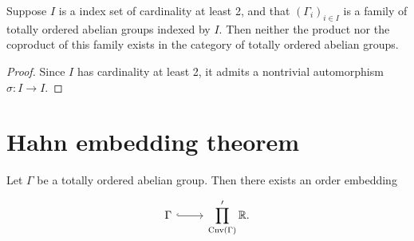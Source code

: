 \begin{lemma}
Suppose $I$ is a index set of cardinality at least 2, and that $(\Gamma_i)_{i \in I}$ is a family of totally ordered abelian groups indexed by $I$. Then neither the product nor the coproduct of this family exists in the category of totally ordered abelian groups. 
\end{lemma}

\begin{proof}
Since $I$ has cardinality at least 2, it admits a nontrivial automorphism $\sigma : I \to I$.
\end{proof}


\section{Hahn embedding theorem}

\begin{proposition}
Let $\Gamma$ be a totally ordered abelian group. Then there exists an order embedding
\[ \begin{tikzcd} \Gamma \ar[hookrightarrow]{r} & \displaystyle \prod_{\Convex(\Gamma)}' \R. \end{tikzcd} \]
\end{proposition}



\printbibliography[heading=bibintoc,title={References}]

